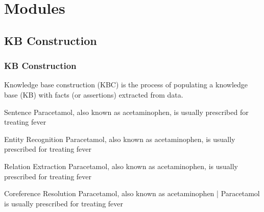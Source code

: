 \documentclass[t]{beamer}
\begin{document}
\section{Modules}
\subsection{KB Construction}
\begin{frame}
    \frametitle{KB Construction}
    \begin{itemize}
    \small{\item Knowledge base construction (KBC) is the process of populating a knowledge base (KB) with facts (or assertions) extracted from data.}
    \end{itemize}
    \begin{block}{Sentence}
        \scriptsize{Paracetamol, also known as acetaminophen, is usually prescribed for treating fever}
    \end{block}
    \begin{block}{Entity Recognition}
        \scriptsize{{\color{red} Paracetamol}, also known as {\color{red} acetaminophen}, is usually prescribed for treating {\color{red} fever}}
    \end{block}
    \begin{block}{Relation Extraction}
        \scriptsize{{\color{red} Paracetamol}, also {\color{teal} known as} {\color{red} acetaminophen}, is usually {\color{teal} prescribed for} treating {\color{red} fever}}
    \end{block}
    \begin{block}{Coreference Resolution}
        \scriptsize{{\color{red} Paracetamol}, also {\color{teal} known as} {\color{red} acetaminophen} | {\color{red} Paracetamol} is usually {\color{teal} prescribed for} treating {\color{red} fever}}
    \end{block}
\end{frame}
\end{document}
